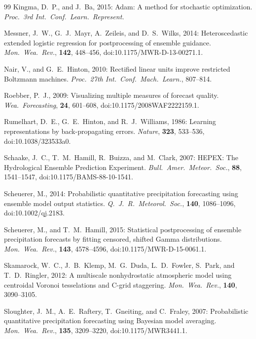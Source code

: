 \documentclass[11pt]{article}
\begin{document}
\begin{thebibliography}{99}
Kingma, D.~P., and J.\ Ba, 2015:
Adam: A method for stochastic optimization.
\textit{Proc.\ 3rd Int.\ Conf.\ Learn.\ Represent.}

Messner, J.~W., G.~J.\ Mayr, A.\ Zeileis, and D.~S.\ Wilks, 2014:
Heteroscedastic extended logistic regression for postprocessing of ensemble
guidance.
\textit{Mon.\ Wea.\ Rev.}, \textbf{142}, 448--456,
doi:10.1175/MWR-D-13-00271.1.

Nair, V., and G.~E.\ Hinton, 2010:
Rectified linear units improve restricted Boltzmann machines.
\textit{Proc.\ 27th Int.\ Conf.\ Mach.\ Learn.}, 807--814.

Roebber, P.~J., 2009:
Visualizing multiple measures of forecast quality.
\textit{Wea.\ Forecasting}, \textbf{24}, 601--608,
doi:10.1175/2008WAF2222159.1.

Rumelhart, D.~E., G.~E.\ Hinton, and R.~J.\ Williams, 1986:
Learning representations by back-propagating errors.
\textit{Nature}, \textbf{323}, 533--536,
doi:10.1038/323533a0.

Schaake, J.~C., T.~M.\ Hamill, R.\ Buizza, and M.\ Clark, 2007:
HEPEX: The Hydrological Ensemble Prediction Experiment.
\textit{Bull.\ Amer.\ Meteor.\ Soc.}, \textbf{88}, 1541--1547,
doi:10.1175/BAMS-88-10-1541.

Scheuerer, M., 2014:
Probabilistic quantitative precipitation forecasting using ensemble model
output statistics.
\textit{Q.\ J.\ R.\ Meteorol.\ Soc.}, \textbf{140}, 1086--1096,
doi:10.1002/qj.2183.

Scheuerer, M., and T.~M.\ Hamill, 2015:
Statistical postprocessing of ensemble precipitation forecasts by fitting
censored, shifted Gamma distributions.
\textit{Mon.\ Wea.\ Rev.}, \textbf{143}, 4578--4596,
doi:10.1175/MWR-D-15-0061.1.

Skamarock, W.~C., J.~B.\ Klemp, M.~G.\ Duda, L.~D.\ Fowler,
S.\ Park, and T.~D.\ Ringler, 2012:
A multiscale nonhydrostatic atmospheric model using centroidal
Voronoi tesselations and C-grid staggering.
\textit{Mon.\ Wea.\ Rev.}, \textbf{140}, 3090--3105.

Sloughter, J.~M., A.~E.\ Raftery, T.\ Gneiting, and C.\ Fraley, 2007:
Probabilistic quantitative precipitation forecasting using Bayesian model
averaging.
\textit{Mon.\ Wea.\ Rev.}, \textbf{135}, 3209--3220,
doi:10.1175/MWR3441.1.


\end{thebibliography}
\end{document}
